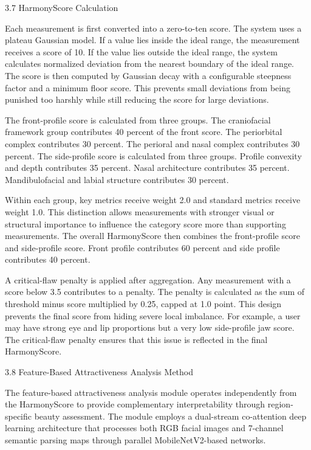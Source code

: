 3.7  HarmonyScore Calculation

Each measurement is first converted into a zero-to-ten score. The system uses a plateau Gaussian model. If a value lies inside the ideal range, the measurement receives a score of 10. If the value lies outside the ideal range, the system calculates normalized deviation from the nearest boundary of the ideal range. The score is then computed by Gaussian decay with a configurable steepness factor and a minimum floor score. This prevents small deviations from being punished too harshly while still reducing the score for large deviations.

The front-profile score is calculated from three groups. The craniofacial framework group contributes 40 percent of the front score. The periorbital complex contributes 30 percent. The perioral and nasal complex contributes 30 percent. The side-profile score is calculated from three groups. Profile convexity and depth contributes 35 percent. Nasal architecture contributes 35 percent. Mandibulofacial and labial structure contributes 30 percent.

Within each group, key metrics receive weight 2.0 and standard metrics receive weight 1.0. This distinction allows measurements with stronger visual or structural importance to influence the category score more than supporting measurements. The overall HarmonyScore then combines the front-profile score and side-profile score. Front profile contributes 60 percent and side profile contributes 40 percent.

A critical-flaw penalty is applied after aggregation. Any measurement with a score below 3.5 contributes to a penalty. The penalty is calculated as the sum of threshold minus score multiplied by 0.25, capped at 1.0 point. This design prevents the final score from hiding severe local imbalance. For example, a user may have strong eye and lip proportions but a very low side-profile jaw score. The critical-flaw penalty ensures that this issue is reflected in the final HarmonyScore.

3.8  Feature-Based Attractiveness Analysis Method

The feature-based attractiveness analysis module operates independently from the HarmonyScore to provide complementary interpretability through region-specific beauty assessment. The module employs a dual-stream co-attention deep learning architecture that processes both RGB facial images and 7-channel semantic parsing maps through parallel MobileNetV2-based networks.

